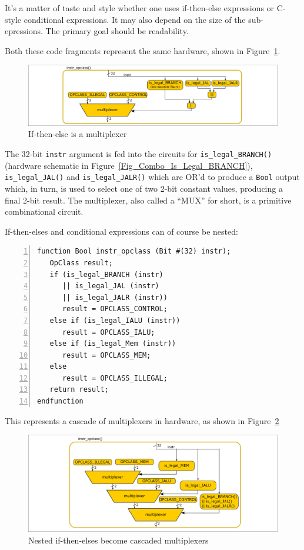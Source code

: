 It's a matter of taste and style whether one uses if-then-else
expressions or C-style conditional expressions.  It may also depend on
the size of the sub-epressions.  The primary goal should be
readability.

Both these code fragments represent the same hardware, shown in
Figure~\ref{Fig_Combo_Multiplexer}.
\begin{figure}[htbp]
  \centerline{\includegraphics[width=6in,angle=0]{ch040/Figures/Fig_Combo_Multiplexer}}
  \caption{\label{Fig_Combo_Multiplexer}If-then-else is a multiplexer}
\end{figure}
The 32-bit \verb|instr| argument is fed into the circuits for
\verb|is_legal_BRANCH()| (hardware schematic in
Figure~\ref{Fig_Combo_Is_Legal_BRANCH}), \verb|is_legal_JAL()| and
\verb|is_legal_JALR()| which are OR'd to produce a \verb|Bool| output
which, in turn, is used to select one of two 2-bit constant values,
producing a final 2-bit result.  The multiplexer, also called a
``MUX'' for short, is a primitive combinational circuit.

If-then-elses and conditional expressions can of course be nested:


\begin{Verbatim}[frame=single, numbers=left]
function Bool instr_opclass (Bit #(32) instr);
   OpClass result;
   if (is_legal_BRANCH (instr)
      || is_legal_JAL (instr)
      || is_legal_JALR (instr))
      result = OPCLASS_CONTROL;
   else if (is_legal_IALU (instr))
      result = OPCLASS_IALU;
   else if (is_legal_Mem (instr))
      result = OPCLASS_MEM;
   else
      result = OPCLASS_ILLEGAL;
   return result;
endfunction
\end{Verbatim}

This represents a cascade of multiplexers in hardware, as shown in
Figure~\ref{Fig_Combo_Multiplexer_Cascade}
\begin{figure}[htbp]
  \centerline{\includegraphics[width=6in,angle=0]{ch040/Figures/Fig_Combo_Multiplexer_Cascade}}
  \caption{\label{Fig_Combo_Multiplexer_Cascade}Nested if-then-elses become cascaded multiplexers}
\end{figure}

